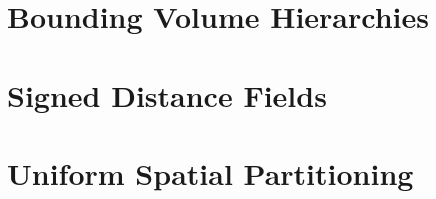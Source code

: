 
\section{Bounding Volume Hierarchies}
\label{sub-sec:bvh}


\section{Signed Distance Fields}
\label{sub-sec:sdf}

\section{Uniform Spatial Partitioning}
\label{sub-sec:usp}

